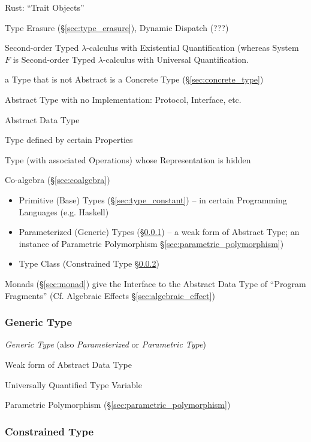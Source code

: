 Rust: ``Trait Objects''

Type Erasure (\S\ref{sec:type_erasure}), Dynamic Dispatch (???)

Second-order Typed $\lambda$-calculus with Existential Quantification
(whereas System $F$ is Second-order Typed $\lambda$-calculus with
Universal Quantification.

a Type that is not Abstract is a Concrete Type
(\S\ref{sec:concrete_type})

Abstract Type with no Implementation: Protocol, Interface, etc.


\asterism


Abstract Data Type

Type defined by certain Properties %

Type (with associated Operations) whose Representation is hidden

Co-algebra (\S\ref{sec:coalgebra})

\begin{itemize}
  \item Primitive (Base) Types (\S\ref{sec:type_constant}) -- in
    certain Programming Languages (e.g. Haskell)
  \item Parameterized (Generic) Types (\S\ref{sec:generic_type}) -- a
    weak form of Abstract Type; an instance of Parametric Polymorphism
    \S\ref{sec:parametric_polymorphism})
  \item Type Class (Constrained Type \S\ref{sec:constrained_type})
\end{itemize}

Monads (\S\ref{sec:monad}) give the Interface to the Abstract Data
Type of ``Program Fragments'' (\fist Cf. Algebraic Effects
\S\ref{sec:algebraic_effect})



\subsubsection{Generic Type}\label{sec:generic_type}

\emph{Generic Type} (also \emph{Parameterized} or \emph{Parametric
  Type})

Weak form of Abstract Data Type

Universally Quantified Type Variable

Parametric Polymorphism (\S\ref{sec:parametric_polymorphism})



\subsubsection{Constrained Type}\label{sec:constrained_type}

